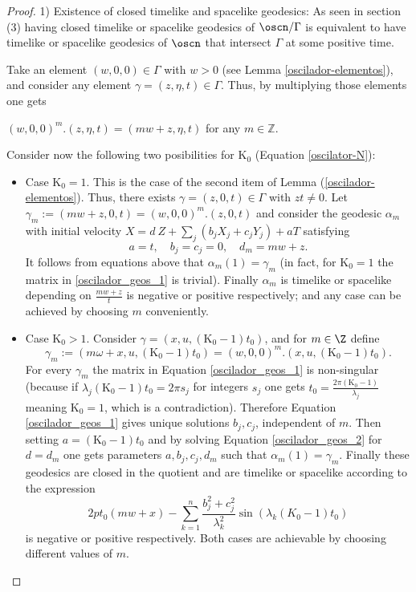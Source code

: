\documentclass[11pt]{amsart}
\theoremstyle{plain}
\theoremstyle{definition}
\theoremstyle{remark}
\begin{document}
		\begin{proof}
						1) Existence of closed timelike and spacelike geodesics: As seen in section (3) having closed timelike or spacelike geodesics of $\oscn/\Gamma$ is equivalent to have timelike or spacelike geodesics of $\oscn$ that intersect $\Gamma$ at some positive time.
			
			Take an element $(w,0,0) \in \Gamma$ with $w>0$ (see Lemma \ref{oscilador-elementos}), and consider any element $\gamma=(z, \eta, t) \in \Gamma$. Thus,  by multiplying those elements one gets  
			
			$(w,0,0)^m.({z}, {\eta},{t})=(m w+{z},{\eta}, {t})$ for any $m \in \mathbb{Z}$. 
			
			Consider now the following two posibilities for $\mathrm{K_0}$ (Equation \eqref{oscilator-N}):
			
			\begin{itemize}
				\item Case $\mathrm{K_0} = 1$. This is the case of the second item of Lemma (\ref{oscilador-elementos}). Thus,  there exists $\gamma = (z,0,t) \in \Gamma$ with $z t \neq 0$. Let $\gamma_m := (m w+z, 0, t)=(w,0,0)^m.(z,0,t)$ and consider the geodesic $\alpha_m$ with initial velocity $X =  d \ Z + \sum_j (b_j X_j + c_j Y_j) + a T$ satisfying 
				$$a=t,\quad b_j=c_j=0, \quad d_m = m w + z.$$ 
				 It follows from equations above that $\alpha_m(1)=\gamma_m$ (in fact, for $\mathrm{K_0}=1$ the matrix in \eqref{oscilador_geos_1} is trivial). Finally $\alpha_m$ is timelike or spacelike depending on  $\frac{mw+z}{t}$ is negative or positive respectively; and  any case can be achieved by choosing $m$ conveniently. 
				
				\item Case $\mathrm{K_0}>1$. Consider $\gamma=(x,u,(\mathrm{K_0}-1)t_0)$, and for $m\in \Z$ define 
				$$\gamma_m := {(m \omega + x, u, (\mathrm{K_0}-1) t_0)} = (w,0,0)^m.(x,u,(\mathrm{K_0}-1) t_0).$$
				 For every $\gamma_m$ the matrix in Equation \eqref{oscilador_geos_1} is non-singular (because if $\lambda_j (\mathrm{K_0}-1) t_0 = 2 \pi s_j$ for integers $s_j$ one gets $t_0 = \frac{2 \pi (\mathrm{K_0}-1)}{\lambda_j}$ meaning $\mathrm{K_0}=1$, which is a contradiction). Therefore Equation \eqref{oscilador_geos_1} gives unique solutions $b_j,c_j$, independent of $m$. Then setting $a=(\mathrm{K_0}-1) t_0$ and by solving Equation \eqref{oscilador_geos_2} for $d=d_m$ one gets parameters $a,b_j,c_j,d_m$ such that $\alpha_m(1) = \gamma_m$.     
				Finally these geodesics are closed in the quotient and are timelike or spacelike according to the expression  $$ 2 p t_0 (mw+x) - \sum_{k=1}^{n} \frac{b_j^2 + c_j^2}{\lambda_k^2}\sin(\lambda_k (K_0-1) t_0) $$ is negative or positive respectively. Both cases are achievable by choosing different values of $m$.
				

\end{itemize}
\end{proof}
\end{document}
